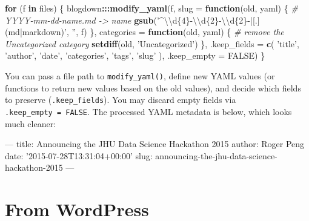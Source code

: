 \documentclass[12pt,]{krantz}
\makeatletter
\newenvironment{Shaded}{\begin{snugshade}}{\end{snugshade}}
\newcommand{\AttributeTok}[1]{\textcolor[rgb]{0.77,0.63,0.00}{#1}}
\newcommand{\CharTok}[1]{\textcolor[rgb]{0.31,0.60,0.02}{#1}}
\newcommand{\CommentTok}[1]{\textcolor[rgb]{0.56,0.35,0.01}{\textit{#1}}}
\newcommand{\ControlFlowTok}[1]{\textcolor[rgb]{0.13,0.29,0.53}{\textbf{#1}}}
\newcommand{\DataTypeTok}[1]{\textcolor[rgb]{0.13,0.29,0.53}{#1}}
\newcommand{\FunctionTok}[1]{\textcolor[rgb]{0.00,0.00,0.00}{#1}}
\newcommand{\KeywordTok}[1]{\textcolor[rgb]{0.13,0.29,0.53}{\textbf{#1}}}
\newcommand{\NormalTok}[1]{#1}
\newcommand{\OperatorTok}[1]{\textcolor[rgb]{0.81,0.36,0.00}{\textbf{#1}}}
\newcommand{\OtherTok}[1]{\textcolor[rgb]{0.56,0.35,0.01}{#1}}
\newcommand{\StringTok}[1]{\textcolor[rgb]{0.31,0.60,0.02}{#1}}
\newenvironment{kframe}{%
\medskip{}
\setlength{\fboxsep}{.8em}
 \def\at@end@of@kframe{}%
 \ifinner\ifhmode%
  \def\at@end@of@kframe{\end{minipage}}%
  \begin{minipage}{\columnwidth}%
 \fi\fi%
 \def\FrameCommand##1{\hskip\@totalleftmargin \hskip-\fboxsep
 \colorbox{shadecolor}{##1}\hskip-\fboxsep
     \hskip-\linewidth \hskip-\@totalleftmargin \hskip\columnwidth}%
 \MakeFramed {\advance\hsize-\width
   \@totalleftmargin\z@ \linewidth\hsize
   \@setminipage}}%
 {\par\unskip\endMakeFramed%
 \at@end@of@kframe}
\renewenvironment{Shaded}{\begin{kframe}}{\end{kframe}}
\theoremstyle{definition}
\theoremstyle{definition}
\theoremstyle{definition}
\theoremstyle{remark}
\makeatother
\begin{document}
\begin{Shaded}
\begin{Highlighting}[]
\ControlFlowTok{for}\NormalTok{ (f }\ControlFlowTok{in}\NormalTok{ files) \{}
\NormalTok{  blogdown}\OperatorTok{:::}\KeywordTok{modify_yaml}\NormalTok{(f, }\DataTypeTok{slug =} \ControlFlowTok{function}\NormalTok{(old, yaml) \{}
    \CommentTok{# YYYY-mm-dd-name.md -> name}
    \KeywordTok{gsub}\NormalTok{(}\StringTok{'^}\CharTok{\textbackslash{}\textbackslash{}}\StringTok{d\{4\}-}\CharTok{\textbackslash{}\textbackslash{}}\StringTok{d\{2\}-}\CharTok{\textbackslash{}\textbackslash{}}\StringTok{d\{2\}-|[.](md|markdown)'}\NormalTok{, }\StringTok{''}\NormalTok{, f)}
\NormalTok{  \}, }\DataTypeTok{categories =} \ControlFlowTok{function}\NormalTok{(old, yaml) \{}
    \CommentTok{# remove the Uncategorized category}
    \KeywordTok{setdiff}\NormalTok{(old, }\StringTok{'Uncategorized'}\NormalTok{)}
\NormalTok{  \}, }\DataTypeTok{.keep_fields =} \KeywordTok{c}\NormalTok{(}
    \StringTok{'title'}\NormalTok{, }\StringTok{'author'}\NormalTok{, }\StringTok{'date'}\NormalTok{, }\StringTok{'categories'}\NormalTok{, }\StringTok{'tags'}\NormalTok{, }\StringTok{'slug'}
\NormalTok{  ), }\DataTypeTok{.keep_empty =} \OtherTok{FALSE}\NormalTok{)}
\NormalTok{\}}
\end{Highlighting}
\end{Shaded}

You can pass a file path to \texttt{modify\_yaml()}, define new YAML
values (or functions to return new values based on the old values), and
decide which fields to preserve (\texttt{.keep\_fields}). You may
discard empty fields via \texttt{.keep\_empty\ =\ FALSE}. The processed
YAML metadata is below, which looks much cleaner:

\begin{Shaded}
\begin{Highlighting}[]
\OtherTok{---}
\FunctionTok{title:}\AttributeTok{ Announcing the JHU Data Science Hackathon 2015}
\FunctionTok{author:}\AttributeTok{ Roger Peng}
\FunctionTok{date:}\AttributeTok{ }\StringTok{'2015-07-28T13:31:04+00:00'}
\FunctionTok{slug:}\AttributeTok{ announcing-the-jhu-data-science-hackathon-2015}
\OtherTok{---}
\end{Highlighting}
\end{Shaded}

\hypertarget{from-wordpress}{%
\section{From WordPress}\label{from-wordpress}}
\end{document}
